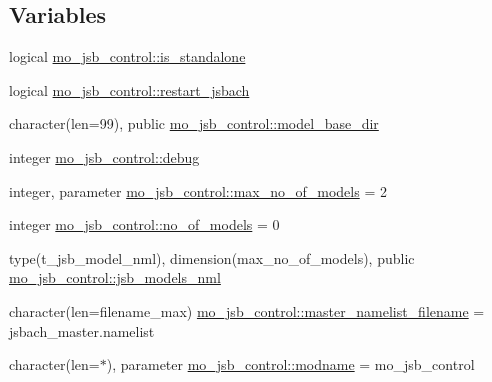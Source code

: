\subsection*{Variables}
\begin{DoxyCompactItemize}
\item 
logical \hyperlink{namespacemo__jsb__control_a4c3add7c94bf9c3fe06ae03bdf9ff1ae}{mo\+\_\+jsb\+\_\+control\+::is\+\_\+standalone}
\item 
logical \hyperlink{namespacemo__jsb__control_a569426bef03961a0e9a5acdf77ddf11a}{mo\+\_\+jsb\+\_\+control\+::restart\+\_\+jsbach}
\item 
character(len=99), public \hyperlink{namespacemo__jsb__control_a7011bd39debd8f5806d4da9947ac38a6}{mo\+\_\+jsb\+\_\+control\+::model\+\_\+base\+\_\+dir}
\item 
integer \hyperlink{namespacemo__jsb__control_a0e797e67df861f0d9dfeb330c5a4fedd}{mo\+\_\+jsb\+\_\+control\+::debug}
\item 
integer, parameter \hyperlink{namespacemo__jsb__control_a8926f94cca1021902c183b3f31c1bb7f}{mo\+\_\+jsb\+\_\+control\+::max\+\_\+no\+\_\+of\+\_\+models} = 2
\item 
integer \hyperlink{namespacemo__jsb__control_ae6883b2aa250bb4b2e2e8ef2d4edea31}{mo\+\_\+jsb\+\_\+control\+::no\+\_\+of\+\_\+models} = 0
\item 
type(t\+\_\+jsb\+\_\+model\+\_\+nml), dimension(max\+\_\+no\+\_\+of\+\_\+models), public \hyperlink{namespacemo__jsb__control_a71f0482fffea3f64acb60c7821436357}{mo\+\_\+jsb\+\_\+control\+::jsb\+\_\+models\+\_\+nml}
\item 
character(len=filename\+\_\+max) \hyperlink{namespacemo__jsb__control_aa607eb23b5df0ed6a04c5163cb0cc82f}{mo\+\_\+jsb\+\_\+control\+::master\+\_\+namelist\+\_\+filename} = \textquotesingle{}jsbach\+\_\+master.\+namelist\textquotesingle{}
\item 
character(len=$\ast$), parameter \hyperlink{namespacemo__jsb__control_aa28a5f0f9a2b85b29e9641a4bc9cd187}{mo\+\_\+jsb\+\_\+control\+::modname} = \textquotesingle{}mo\+\_\+jsb\+\_\+control\textquotesingle{}
\end{DoxyCompactItemize}
